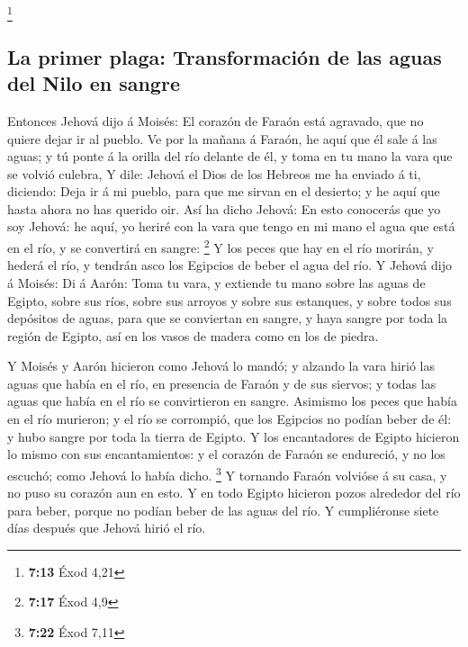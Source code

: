 \footnote{\textbf{7:13} Éxod 4,21}

\hypertarget{la-primer-plaga-transformaciuxf3n-de-las-aguas-del-nilo-en-sangre}{%
\subsection{La primer plaga: Transformación de las aguas del Nilo en
sangre}\label{la-primer-plaga-transformaciuxf3n-de-las-aguas-del-nilo-en-sangre}}

 Entonces Jehová dijo á Moisés: El corazón de Faraón está
agravado, que no quiere dejar ir al pueblo.  Ve por la
mañana á Faraón, he aquí que él sale á las aguas; y tú ponte á la orilla
del río delante de él, y toma en tu mano la vara que se volvió culebra,
 Y dile: Jehová el Dios de los Hebreos me ha enviado á ti,
diciendo: Deja ir á mi pueblo, para que me sirvan en el desierto; y he
aquí que hasta ahora no has querido oir.  Así ha dicho
Jehová: En esto conocerás que yo soy Jehová: he aquí, yo heriré con la
vara que tengo en mi mano el agua que está en el río, y se convertirá en
sangre: \footnote{\textbf{7:17} Éxod 4,9}  Y los peces que
hay en el río morirán, y hederá el río, y tendrán asco los Egipcios de
beber el agua del río.  Y Jehová dijo á Moisés: Di á Aarón:
Toma tu vara, y extiende tu mano sobre las aguas de Egipto, sobre sus
ríos, sobre sus arroyos y sobre sus estanques, y sobre todos sus
depósitos de aguas, para que se conviertan en sangre, y haya sangre por
toda la región de Egipto, así en los vasos de madera como en los de
piedra.

 Y Moisés y Aarón hicieron como Jehová lo mandó; y alzando
la vara hirió las aguas que había en el río, en presencia de Faraón y de
sus siervos; y todas las aguas que había en el río se convirtieron en
sangre.  Asimismo los peces que había en el río murieron; y
el río se corrompió, que los Egipcios no podían beber de él: y hubo
sangre por toda la tierra de Egipto.  Y los encantadores de
Egipto hicieron lo mismo con sus encantamientos: y el corazón de Faraón
se endureció, y no los escuchó; como Jehová lo había dicho. \footnote{\textbf{7:22}
  Éxod 7,11}  Y tornando Faraón volvióse á su casa, y no
puso su corazón aun en esto.  Y en todo Egipto hicieron
pozos alrededor del río para beber, porque no podían beber de las aguas
del río.  Y cumpliéronse siete días después que Jehová
hirió el río.


